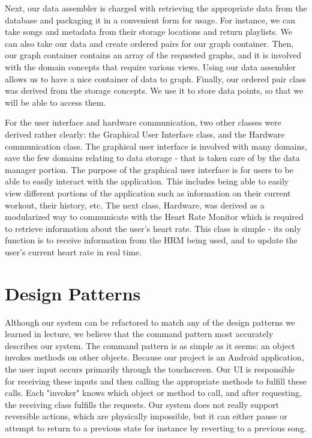 \documentclass[letterpaper,english, 12pt]{scrreprt}
\begin{document}
	Next, our data assembler is charged with retrieving the appropriate data from the database and packaging it in a convenient form for usage. For instance, we can take songs and metadata from their storage locations and return playlists. We can also take our data and create ordered pairs for our graph container. Then, our graph container contains an array of the requested graphs, and it is involved with the domain concepts that require various views. Using our data assembler allows us to have a nice container of data to graph. Finally, our ordered pair class was derived from the storage concepts. We use it to store data points, so that we will be able to access them.

    For the user interface and hardware communication, two other classes were derived rather clearly: the Graphical User Interface class, and the Hardware communication class. The graphical user interface is involved with many domains, save the few domains relating to data storage - that is taken care of by the data manager portion. The purpose of the graphical user interface is for users to be able to easily interact with the application. This includes being able to easily view different portions of the application such as information on their current workout, their history, etc. The next class, Hardware, was derived as a modularized way to communicate with the Heart Rate Monitor which is required to retrieve information about the user's heart rate. This class is simple - its only function is to receive information from the HRM being used, and to update the user's current heart rate in real time.

\section{Design Patterns}

	Although our system can be refactored to match any of the design patterns we learned in lecture, we believe that the command pattern most accurately describes our system. The command pattern is as simple as it seems: an object invokes methods on other objects. Because our project is an Android application, the user input occurs primarily through the touchscreen. Our UI is responsible for receiving these inputs and then calling the appropriate methods to fulfill these calls. Each "invoker" knows which object or method to call, and after requesting, the receiving class fulfills the requests. Our system does not really support reversible actions, which are physically impossible, but it can either pause or attempt to return to a previous state for instance by reverting to a previous song. 
\end{document}
